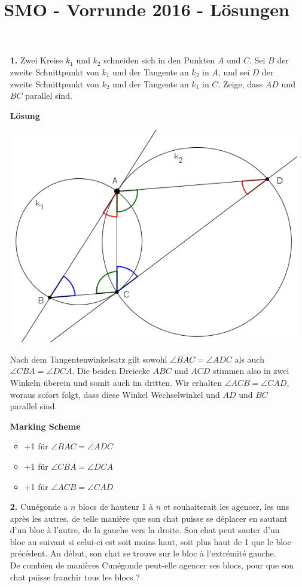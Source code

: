 \documentclass[language=german,style=solution]{smo}
\title{SMO - Vorrunde 2016 - Lösungen}
\begin{document}
\begin{enumerate}

\item[\textbf{1.}] 
Zwei Kreise $k_1$ und $k_2$ schneiden sich in den Punkten $A$ und $C$. Sei $B$ der zweite Schnittpunkt von $k_1$ und der Tangente an $k_2$ in $A$, und sei $D$ der zweite Schnittpunkt von $k_2$ und der Tangente an $k_1$ in $C$. Zeige, dass $AD$ und $BC$ parallel sind.

\textbf{Lösung}

\includegraphics{muloe_2016_aufgabe1.png}

Nach dem Tangentenwinkelsatz gilt sowohl $\angle BAC=\angle ADC$ als auch $\angle CBA=\angle DCA$. Die beiden Dreiecke $ABC$ und $ACD$ stimmen also in zwei Winkeln überein und somit auch im dritten. Wir erhalten $\angle ACB=\angle CAD$, woraus sofort folgt, dass diese Winkel Wechselwinkel und $AD$ und $BC$ parallel sind.

\textbf{Marking Scheme}
\begin{itemize}
\item +1 für $\angle BAC=\angle ADC$
\item +1 für $\angle CBA=\angle DCA$
\item +1 für $\angle ACB=\angle CAD$
\end{itemize}

\newpage

\item[\textbf{2.}] 
Cunégonde a $n$ blocs de hauteur 1 à $n$ et souhaiterait les agencer, les uns après les autres, de telle manière que son chat puisse se déplacer en sautant d'un bloc à l'autre, de la gauche vers la droite. Son chat peut sauter d'un bloc au suivant si celui-ci est soit moins haut, soit plus haut de 1 que le bloc précédent. Au début, son chat se trouve sur le bloc à l'extrémité gauche.\\
De combien de manières Cunégonde peut-elle agencer ses blocs, pour que son chat puisse franchir tous les blocs ?


\end{enumerate}
\end{document}
